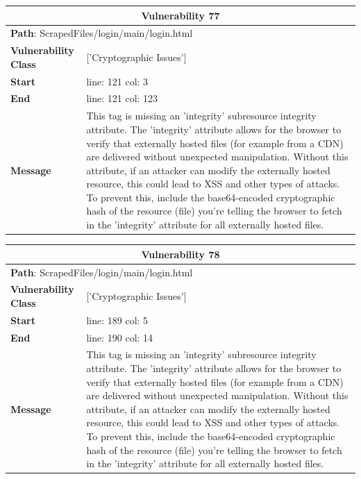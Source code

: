 \documentclass[12pt]{article}
\begin{document}
\vspace{0.7cm}
\FloatBarrier
\begin{table}[!h]
\centering
\renewcommand{\arraystretch}{1.3}
\begin{tabular}{|l|p{10cm}|}
\hline
\multicolumn{2}{|c|}{\textbf{Vulnerability 77}} \\
\hline
\multicolumn{2}{|l|}{\textbf{Path}: ScrapedFiles/login/main/login.html} \\
\hline
\textbf{Vulnerability Class} & ['Cryptographic Issues'] \\
\hline
\textbf{Start} & line: 121 \quad col: 3 \\
\hline
\textbf{End} & line: 121 \quad col: 123 \\
\hline
\textbf{Message} & This tag is missing an 'integrity' subresource integrity attribute. The 'integrity' attribute allows for the browser to verify that externally hosted files (for example from a CDN) are delivered without unexpected manipulation. Without this attribute, if an attacker can modify the externally hosted resource, this could lead to XSS and other types of attacks. To prevent this, include the base64-encoded cryptographic hash of the resource (file) you're telling the browser to fetch in the 'integrity' attribute for all externally hosted files. \\
\hline
\end{tabular}
\end{table}
\vspace{0.7cm}
\FloatBarrier
\begin{table}[!h]
\centering
\renewcommand{\arraystretch}{1.3}
\begin{tabular}{|l|p{10cm}|}
\hline
\multicolumn{2}{|c|}{\textbf{Vulnerability 78}} \\
\hline
\multicolumn{2}{|l|}{\textbf{Path}: ScrapedFiles/login/main/login.html} \\
\hline
\textbf{Vulnerability Class} & ['Cryptographic Issues'] \\
\hline
\textbf{Start} & line: 189 \quad col: 5 \\
\hline
\textbf{End} & line: 190 \quad col: 14 \\
\hline
\textbf{Message} & This tag is missing an 'integrity' subresource integrity attribute. The 'integrity' attribute allows for the browser to verify that externally hosted files (for example from a CDN) are delivered without unexpected manipulation. Without this attribute, if an attacker can modify the externally hosted resource, this could lead to XSS and other types of attacks. To prevent this, include the base64-encoded cryptographic hash of the resource (file) you're telling the browser to fetch in the 'integrity' attribute for all externally hosted files. \\
\hline
\end{tabular}
\end{table}
\end{document}
